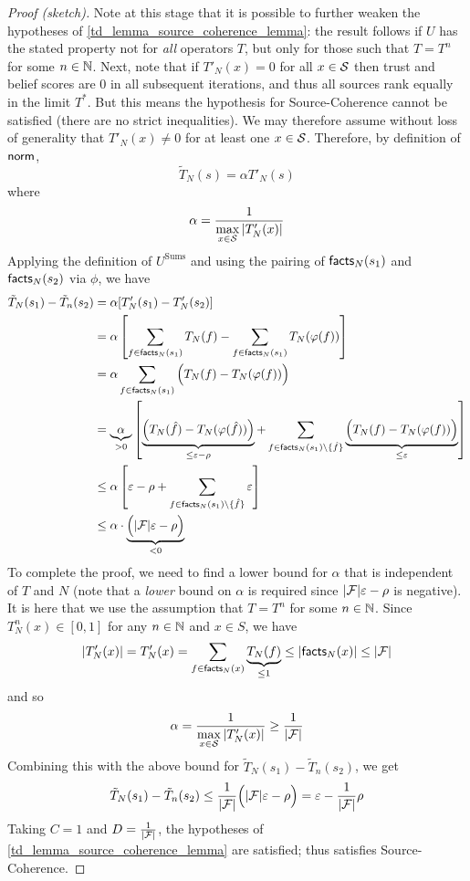 \begin{proof}[Proof (sketch)]
Note at this stage that it is possible to further weaken the hypotheses of
\cref{td_lemma_source_coherence_lemma}: the result follows if $U$ has the
stated property not for \emph{all} operators $T$, but only for those such that
$T = T^n$ for some $n \in \Nat$. Next, note that if $T'_N(x) = 0$ for all $x
\in \S$ then trust and belief scores are 0 in all subsequent iterations, and
thus all sources rank equally in the limit $T^*$.  But this means the
hypothesis for Source-Coherence cannot be satisfied (there are no strict
inequalities). We may therefore assume without loss of generality that $T'_N(x)
\ne 0$ for at least one $x \in \S$. Therefore, by definition of $\norm$,
\[
    \tilde{T}_N(s) = \alpha T'_N(s)
\]
where
\[
    \alpha = \frac{1}{\max\limits_{x \in \S}{|T'_N(x)|}}
\]
Applying the definition of $U^{\text{Sums}}$ and using the pairing of $\facts_N(s_1)$
and $\facts_N(s_2)$ via $\phi$, we have
\begin{align*}
    \tilde{T}_N(s_1) - \tilde{T}_n(s_2)
    &= \alpha[T'_N(s_1) - T'_N(s_2)] \\
    &= \alpha \left[
        \sum_{f \in \facts_N(s_1)}{T_N(f)}
        -
        \sum_{f \in \facts_N(s_1)}{T_N(\phi(f))}
    \right] \\
    &= \alpha
        \sum_{f \in \facts_N(s_1)}{
            \Big(
                T_N(f) - T_N(\phi(f))
            \Big)
        } \\
    &= \underbrace{\alpha}_{> 0}
       \left[
        \underbrace{
            \Big(
                T_N(\hat{f}) - T_N(\phi(\hat{f}))
            \Big)
        }_{\le \epsilon - \rho}
        +
        \sum_{f \in \facts_N(s_1) \setminus \{\hat{f}\} }{
            \underbrace{
                \Big(
                    T_N(f) - T_N(\phi(f))
                \Big)
            }_{\le \epsilon}
        }
    \right] \\
    & \le \alpha
       \left[
        \epsilon - \rho
        +
        \sum_{f \in \facts_N(s_1) \setminus \{\hat{f}\} }{
            \epsilon
        }
    \right] \\
    & \le \alpha
      \cdot
      \underbrace{
        \Big(|\F|\epsilon - \rho\Big)
      }_{< 0}
\end{align*}
To complete the proof, we need to find a lower bound for $\alpha$ that is
independent of $T$ and $N$ (note that a \emph{lower} bound on $\alpha$ is
required since $|\F|\epsilon - \rho$ is negative). It is here that we use the
assumption that $T = T^n$ for some $n \in \Nat$. Since $T^n_N(x) \in [0,1]$ for
any $n \in \Nat$ and $x \in S$, we have
\[
    |T_N'(x)|
    = T_N'(x)
    = \sum_{f \in \facts_N(x)}{
           \underbrace{T_N(f)}_{\le 1}
       }
     \le |\facts_N(x)|
     \le |\F|
\]
and so
\[
    \alpha
    = \frac{1}{\max\limits_{x \in \S}{|T'_N(x)|}}
    \ge \frac{1}{|\F|}
\]
Combining this with the above bound for $\tilde{T}_N(s_1) - \tilde{T}_n(s_2)$,
we get
\[
    \tilde{T}_N(s_1) - \tilde{T}_n(s_2)
    \le
    \frac{1}{|\F|} \Big(
        |\F|\epsilon - \rho
    \Big)
    = \epsilon - \frac{1}{|\F|}\rho
\]
Taking $C = 1$ and $D = \frac{1}{|\F|}$, the hypotheses of
\cref{td_lemma_source_coherence_lemma} are satisfied; thus \sums{} satisfies
Source-Coherence.


\end{proof}
